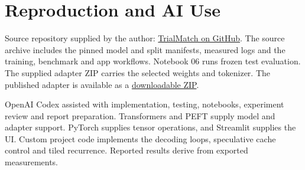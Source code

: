 \documentclass[conference]{IEEEtran}
\begin{document}
\section{Reproduction and AI Use}
Source repository supplied by the author: \href{https://github.com/M-Shaffan-Ahmad/TrialMatch-A-traceable-screening-workspace}{TrialMatch on GitHub}. The source archive includes the pinned model and split manifests, measured logs and the training, benchmark and app workflows. Notebook 06 runs frozen test evaluation. The supplied adapter ZIP carries the selected weights and tokenizer. The published adapter is available as a \href{https://github.com/M-Shaffan-Ahmad/TrialMatch-A-traceable-screening-workspace/raw/f6d5ea50e408df3ccae7795f00dc44d8d764edfb/trialmatch-selected-adapter.zip}{downloadable ZIP}.

OpenAI Codex assisted with implementation, testing, notebooks, experiment review and report preparation. Transformers and PEFT supply model and adapter support. PyTorch supplies tensor operations, and Streamlit supplies the UI. Custom project code implements the decoding loops, speculative cache control and tiled recurrence. Reported results derive from exported measurements.


\end{document}
